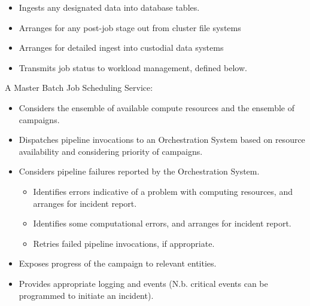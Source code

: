 \begin{itemize}
    \begin{itemize}

    \item Ingests any designated data into database tables.

    \item Arranges for any post-job stage out from cluster file systems

    \item Arranges for detailed ingest into custodial data systems

    \item Transmits job status to workload management, defined below.

    \end{itemize}

\end{itemize}

A Master Batch Job Scheduling Service:

\begin{itemize}

\item Considers the ensemble of available compute resources and the ensemble of
campaigns.

\item Dispatches pipeline invocations to an Orchestration System based on
resource availability and considering priority of campaigns.

\item Considers pipeline failures reported by the Orchestration System.

    \begin{itemize}

    \item Identifies errors indicative of a problem with computing resources,
    and arranges for incident report.

    \item Identifies some computational errors, and arranges for incident report.

    \item Retries failed pipeline invocations, if appropriate.

    \end{itemize}

\item Exposes progress of the campaign to relevant entities.

\item Provides appropriate logging and events (N.b. critical events can be
programmed to initiate an incident).

\end{itemize}

